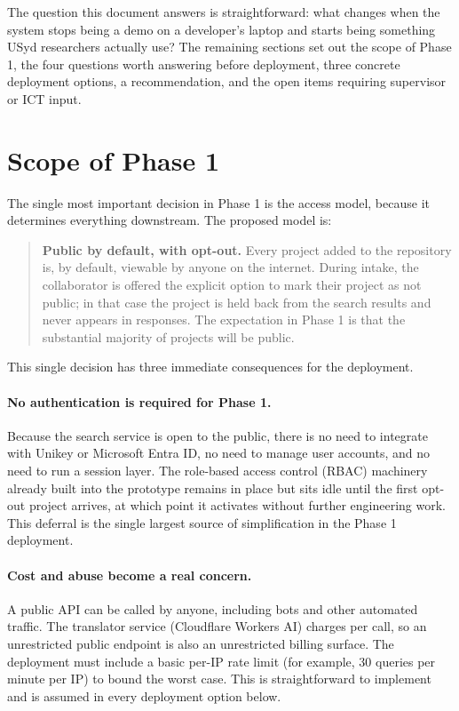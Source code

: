 \documentclass[11pt,a4paper]{article}
\begin{document}
\medskip

The question this document answers is straightforward: what changes when the system stops being a demo on a developer's laptop and starts being something USyd researchers actually use? The remaining sections set out the scope of Phase 1, the four questions worth answering before deployment, three concrete deployment options, a recommendation, and the open items requiring supervisor or ICT input.

\section{Scope of Phase 1}

The single most important decision in Phase 1 is the access model, because it determines everything downstream. The proposed model is:

\begin{quote}
\textbf{Public by default, with opt-out.} Every project added to the repository is, by default, viewable by anyone on the internet. During intake, the collaborator is offered the explicit option to mark their project as not public; in that case the project is held back from the search results and never appears in responses. The expectation in Phase 1 is that the substantial majority of projects will be public.
\end{quote}

This single decision has three immediate consequences for the deployment.

\paragraph{No authentication is required for Phase 1.} Because the search service is open to the public, there is no need to integrate with Unikey or Microsoft Entra ID, no need to manage user accounts, and no need to run a session layer. The role-based access control (RBAC) machinery already built into the prototype remains in place but sits idle until the first opt-out project arrives, at which point it activates without further engineering work. This deferral is the single largest source of simplification in the Phase 1 deployment.

\paragraph{Cost and abuse become a real concern.} A public API can be called by anyone, including bots and other automated traffic. The translator service (Cloudflare Workers AI) charges per call, so an unrestricted public endpoint is also an unrestricted billing surface. The deployment must include a basic per-IP rate limit (for example, 30 queries per minute per IP) to bound the worst case. This is straightforward to implement and is assumed in every deployment option below.
\end{document}
